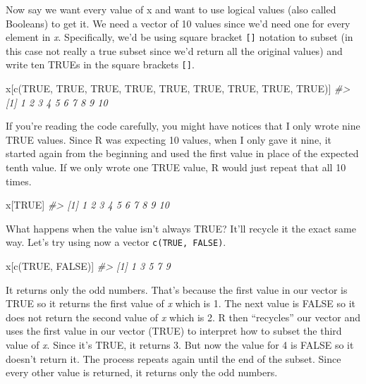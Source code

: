 \documentclass[
]{krantz}
\makeatletter
\newenvironment{Shaded}{\begin{snugshade}}{\end{snugshade}}
\newcommand{\CommentTok}[1]{\textcolor[rgb]{0.37,0.37,0.37}{\textit{#1}}}
\newcommand{\ConstantTok}[1]{\textcolor[rgb]{0,0,0}{#1}}
\newcommand{\FunctionTok}[1]{\textcolor[rgb]{0,0,0}{#1}}
\newcommand{\NormalTok}[1]{#1}
\newenvironment{kframe}{%
\medskip{}
\setlength{\fboxsep}{.8em}
 \def\at@end@of@kframe{}%
 \ifinner\ifhmode%
  \def\at@end@of@kframe{\end{minipage}}%
  \begin{minipage}{\columnwidth}%
 \fi\fi%
 \def\FrameCommand##1{\hskip\@totalleftmargin \hskip-\fboxsep
 \colorbox{shadecolor}{##1}\hskip-\fboxsep
     \hskip-\linewidth \hskip-\@totalleftmargin \hskip\columnwidth}%
 \MakeFramed {\advance\hsize-\width
   \@totalleftmargin\z@ \linewidth\hsize
   \@setminipage}}%
 {\par\unskip\endMakeFramed%
 \at@end@of@kframe}
\renewenvironment{Shaded}{\begin{kframe}}{\end{kframe}}
\makeatother
\begin{document}
Now say we want every value of x and want to use logical
values (also called Booleans) to get it. We need a vector of
10 values since we'd need one for every element in \emph{x}.
Specifically, we'd be using square bracket \texttt{{[}{]}}
notation to subset (in this case not really a true subset
since we'd return all the original values) and write ten
TRUEs in the square brackets \texttt{{[}{]}}.

\begin{Shaded}
\begin{Highlighting}[]
\NormalTok{x[}\FunctionTok{c}\NormalTok{(}\ConstantTok{TRUE}\NormalTok{, }\ConstantTok{TRUE}\NormalTok{, }\ConstantTok{TRUE}\NormalTok{, }\ConstantTok{TRUE}\NormalTok{, }\ConstantTok{TRUE}\NormalTok{, }\ConstantTok{TRUE}\NormalTok{, }\ConstantTok{TRUE}\NormalTok{, }\ConstantTok{TRUE}\NormalTok{, }\ConstantTok{TRUE}\NormalTok{)]}
\CommentTok{\#\textgreater{}  [1]  1  2  3  4  5  6  7  8  9 10}
\end{Highlighting}
\end{Shaded}

If you're reading the code carefully, you might have notices
that I only wrote nine TRUE values. Since R was expecting 10
values, when I only gave it nine, it started again from the
beginning and used the first value in place of the expected
tenth value. If we only wrote one TRUE value, R would just
repeat that all 10 times.

\begin{Shaded}
\begin{Highlighting}[]
\NormalTok{x[}\ConstantTok{TRUE}\NormalTok{]}
\CommentTok{\#\textgreater{}  [1]  1  2  3  4  5  6  7  8  9 10}
\end{Highlighting}
\end{Shaded}

What happens when the value isn't always TRUE? It'll recycle
it the exact same way. Let's try using now a vector
\texttt{c(TRUE,\ FALSE)}.

\begin{Shaded}
\begin{Highlighting}[]
\NormalTok{x[}\FunctionTok{c}\NormalTok{(}\ConstantTok{TRUE}\NormalTok{, }\ConstantTok{FALSE}\NormalTok{)]}
\CommentTok{\#\textgreater{} [1] 1 3 5 7 9}
\end{Highlighting}
\end{Shaded}

It returns only the odd numbers. That's because the first
value in our vector is TRUE so it returns the first value of
\emph{x} which is 1. The next value is FALSE so it does not
return the second value of \emph{x} which is 2. R then
``recycles'' our vector and uses the first value in our
vector (TRUE) to interpret how to subset the third value of
\emph{x}. Since it's TRUE, it returns 3. But now the value
for 4 is FALSE so it doesn't return it. The process repeats
again until the end of the subset. Since every other value
is returned, it returns only the odd numbers.
\end{document}

